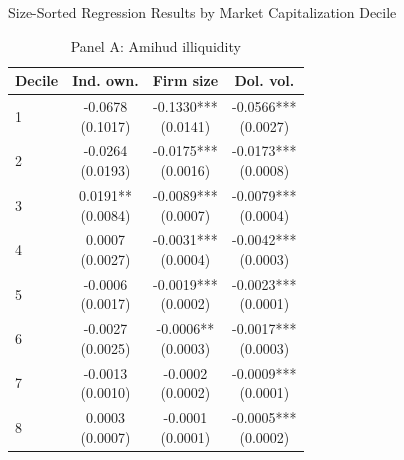 \begin{table}[!htbp]\centering
\caption{Size-Sorted Regression Results by Market Capitalization Decile}
\label{tab:size_sorted_regression_results}
\begin{threeparttable}
\footnotesize
\setlength{\tabcolsep}{1.5pt}
\renewcommand{\arraystretch}{0.86}
\noindent\begin{minipage}[t]{0.46\textwidth}
\begin{subtable}[t]{\linewidth}
\caption{Panel A: Amihud illiquidity}
\centering
\begin{tabular}{@{}lccc@{}}
\toprule
Decile & Ind. own. & Firm size & Dol. vol. \\
\midrule
1 & \shortstack{-0.0678\\(0.1017)} & \shortstack{-0.1330***\\(0.0141)} & \shortstack{-0.0566***\\(0.0027)} \\
2 & \shortstack{-0.0264\\(0.0193)} & \shortstack{-0.0175***\\(0.0016)} & \shortstack{-0.0173***\\(0.0008)} \\
3 & \shortstack{0.0191**\\(0.0084)} & \shortstack{-0.0089***\\(0.0007)} & \shortstack{-0.0079***\\(0.0004)} \\
4 & \shortstack{0.0007\\(0.0027)} & \shortstack{-0.0031***\\(0.0004)} & \shortstack{-0.0042***\\(0.0003)} \\
5 & \shortstack{-0.0006\\(0.0017)} & \shortstack{-0.0019***\\(0.0002)} & \shortstack{-0.0023***\\(0.0001)} \\
6 & \shortstack{-0.0027\\(0.0025)} & \shortstack{-0.0006**\\(0.0003)} & \shortstack{-0.0017***\\(0.0003)} \\
7 & \shortstack{-0.0013\\(0.0010)} & \shortstack{-0.0002\\(0.0002)} & \shortstack{-0.0009***\\(0.0001)} \\
8 & \shortstack{0.0003\\(0.0007)} & \shortstack{-0.0001\\(0.0001)} & \shortstack{-0.0005***\\(0.0002)} \\

\end{tabular}
\end{subtable}
\end{minipage}
\end{threeparttable}
\end{table}
